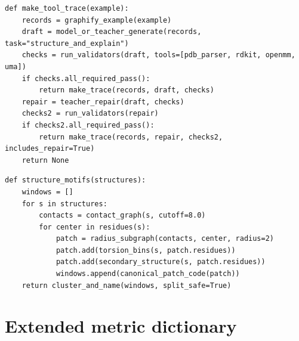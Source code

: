 \documentclass[11pt]{article}
\newcommand{\1}{\mathbf{1}}
\begin{document}
\begin{lstlisting}[caption={Synthetic verified tool-trace construction.}]
def make_tool_trace(example):
    records = graphify_example(example)
    draft = model_or_teacher_generate(records, task="structure_and_explain")
    checks = run_validators(draft, tools=[pdb_parser, rdkit, openmm, uma])
    if checks.all_required_pass():
        return make_trace(records, draft, checks)
    repair = teacher_repair(draft, checks)
    checks2 = run_validators(repair)
    if checks2.all_required_pass():
        return make_trace(records, repair, checks2, includes_repair=True)
    return None
\end{lstlisting}

\begin{lstlisting}[caption={Structure-derived motif construction.}]
def structure_motifs(structures):
    windows = []
    for s in structures:
        contacts = contact_graph(s, cutoff=8.0)
        for center in residues(s):
            patch = radius_subgraph(contacts, center, radius=2)
            patch.add(torsion_bins(s, patch.residues))
            patch.add(secondary_structure(s, patch.residues))
            windows.append(canonical_patch_code(patch))
    return cluster_and_name(windows, split_safe=True)
\end{lstlisting}

\section{Extended metric dictionary}
\end{document}
